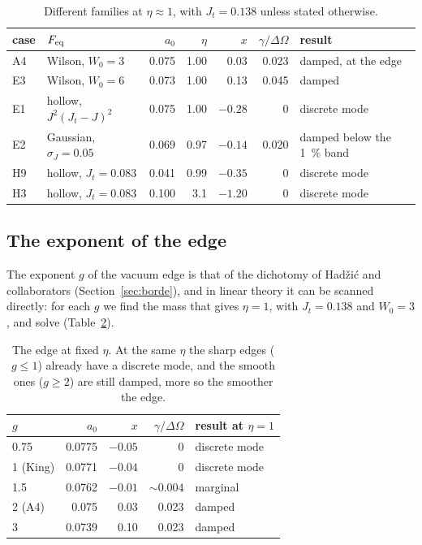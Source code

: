 \documentclass[11pt,a4paper]{article}
\begin{document}
\begin{table}[!htbp]
\centering
\small
\begin{tabular}{llrrrrl}
\toprule
case & $F_{\rm eq}$ & $a_0$ & $\eta$ & $x$ & $\gamma/\Delta\Omega$ & result\\
\midrule
A4 & Wilson, $W_0=3$ & 0.075 & 1.00 & 0.03 & 0.023 & damped, at the edge\\
E3 & Wilson, $W_0=6$ & 0.073 & 1.00 & 0.13 & 0.045 & damped\\
E1 & hollow, $J^2(J_t-J)^2$ & 0.075 & 1.00 & $-0.28$ & 0 & discrete mode\\
E2 & Gaussian, $\sigma_J=0.05$ & 0.069 & 0.97 & $-0.14$ & 0.020 & damped below the \SI{1}{\%} band\\
H9 & hollow, $J_t=0.083$ & 0.041 & 0.99 & $-0.35$ & 0 & discrete mode\\
H3 & hollow, $J_t=0.083$ & 0.100 & 3.1 & $-1.20$ & 0 & discrete mode\\
\bottomrule
\end{tabular}
\caption{Different families at $\eta\approx1$, with $J_t=0.138$ unless stated otherwise.}
\label{tab:familias_lineal}
\end{table}

\subsection{The exponent of the edge}
\label{sec:borde_lineal}

The exponent $g$ of the vacuum edge is that of the dichotomy of Hadžić and collaborators
(Section~\ref{sec:borde}), and in linear theory it can be scanned directly: for each $g$ we
find the mass that gives $\eta=1$, with $J_t=0.138$ and $W_0=3$, and solve
(Table~\ref{tab:borde}).

\begin{table}[!htbp]
\centering
\small
\begin{tabular}{lrrrl}
\toprule
$g$ & $a_0$ & $x$ & $\gamma/\Delta\Omega$ & result at $\eta=1$\\
\midrule
0.75 & 0.0775 & $-0.05$ & 0 & discrete mode\\
1 (King) & 0.0771 & $-0.04$ & 0 & discrete mode\\
1.5 & 0.0762 & $-0.01$ & $\sim0.004$ & marginal\\
2 (A4) & 0.075 & 0.03 & 0.023 & damped\\
3 & 0.0739 & 0.10 & 0.023 & damped\\
\bottomrule
\end{tabular}
\caption{The edge at fixed $\eta$. At the same $\eta$ the sharp edges ($g\le1$) already have a
discrete mode, and the smooth ones ($g\ge2$) are still damped, more so the smoother the
edge.}
\label{tab:borde}
\end{table}
\end{document}
